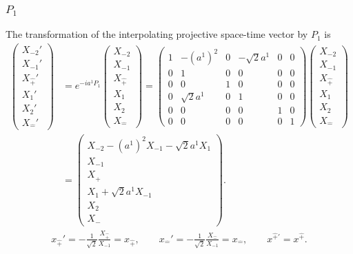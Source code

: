 \documentclass[foundations,article,submit,pdftex,moreauthors]{Definitions/mdpi}
\begin{document}
\subsubsection{\texorpdfstring{$P_{1}$}{P1}}

The transformation of the interpolating projective space-time vector by
$P_1$ is
\begin{align}
\begin{pmatrix}
X_{-2}'\\ X_{-1}'\\ X_{\hat{+}}'\\ X_1'\\ X_2'\\ X_{\hat{-}}'
\end{pmatrix}
&=e^{-ia^1P_1}
\begin{pmatrix}
X_{-2}\\ X_{-1}\\ X_{\hat{+}}\\ X_1\\ X_2\\ X_{\hat{-}}
\end{pmatrix}
=\begin{pmatrix}
1 & - (a^{1})^{2} & 0 & - \sqrt{2} a^{1} & 0 & 0\\
0 & 1 & 0 & 0 & 0 & 0\\
0 & 0 & 1 & 0 & 0 & 0\\
0 & \sqrt{2} a^{1} & 0 & 1 & 0 & 0\\
0 & 0 & 0 & 0 & 1 & 0\\
0 & 0 & 0 & 0 & 0 & 1
\end{pmatrix}
\begin{pmatrix}
X_{-2}\\ X_{-1}\\ X_{\hat{+}}\\ X_1\\ X_2\\ X_{\hat{-}}
\end{pmatrix}\\
&=\begin{pmatrix}
X_{-2}-(a^1)^2X_{-1}-\sqrt{2}a^1X_1\\
X_{-1}\\ X_{\hat{+}}\\ X_1+\sqrt{2}a^1X_{-1}\\ X_2\\ X_{\hat{-}}
\end{pmatrix}.
\end{align}
\begin{align}
x_{\hat{+}}'=-\frac{1}{\sqrt{2}}\frac{X_{\hat{+}}}{X_{-1}}=x_{\hat{+}},\qquad
x_{\hat{-}}'=-\frac{1}{\sqrt{2}}\frac{X_{\hat{-}}}{X_{-1}}=x_{\hat{-}},\qquad
x^{\hat{+}\prime}=x^{\hat{+}}.
\end{align}
\end{document}
